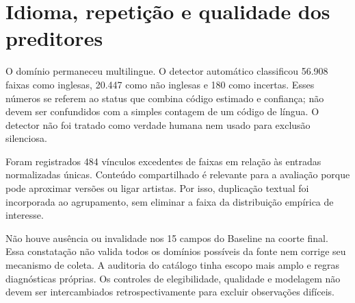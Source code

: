\section{Idioma, repetição e qualidade dos preditores}
O domínio permaneceu multilingue. O detector automático classificou 56.908 faixas como inglesas, 20.447 como não inglesas e 180 como incertas. Esses números se referem ao status que combina código estimado e confiança; não devem ser confundidos com a simples contagem de um código de língua. O detector não foi tratado como verdade humana nem usado para exclusão silenciosa.

Foram registrados 484 vínculos excedentes de faixas em relação às entradas normalizadas únicas. Conteúdo compartilhado é relevante para a avaliação porque pode aproximar versões ou ligar artistas. Por isso, duplicação textual foi incorporada ao agrupamento, sem eliminar a faixa da distribuição empírica de interesse.

Não houve ausência ou invalidade nos 15 campos do Baseline na coorte final. Essa constatação não valida todos os domínios possíveis da fonte nem corrige seu mecanismo de coleta. A auditoria do catálogo tinha escopo mais amplo e regras diagnósticas próprias. Os controles de elegibilidade, qualidade e modelagem não devem ser intercambiados retrospectivamente para excluir observações difíceis.
